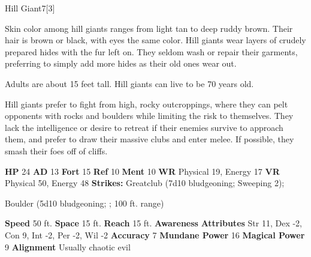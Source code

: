       
  \begin{monsubsection}{Hill Giant}{7}[3]
    \vspace{-1em}\vspace{-1em}
    \vspace{0em}

    
        Skin color among hill giants ranges from light tan to deep ruddy brown. Their hair is brown or black, with eyes the same color. Hill giants wear layers of crudely prepared hides with the fur left on. They seldom wash or repair their garments, preferring to simply add more hides as their old ones wear out.

        Adults are about 15 feet tall. Hill giants can live to be 70 years old.
      
        Hill giants prefer to fight from high, rocky outcroppings, where they can pelt opponents with rocks and boulders while limiting the risk to themselves.
        They lack the intelligence or desire to retreat if their enemies survive to approach them, and prefer to draw their massive clubs and enter melee.
        If possible, they smash their foes off of cliffs.
      

    \begin{spellcontent}
      \begin{spelltargetinginfo}
        \pari \textbf{HP} 24 \monsep
          \textbf{AD} 13 \monsep
          \textbf{Fort} 15 \monsep
          \textbf{Ref} 10 \monsep
          \textbf{Ment} 10
        \pari \textbf{WR} Physical 19, Energy 17 \monsep
        \textbf{VR} Physical 50, Energy 48
        \pari \textbf{Strikes:}
            Greatclub  (7d10 bludgeoning; Sweeping 2);
\par Boulder  (5d10 bludgeoning; ; 100 ft. range)
      \end{spelltargetinginfo}
    \end{spellcontent}
    \begin{monsterfooter}
      \pari \textbf{Speed} 50 ft. \monsep
        \textbf{Space} 15 ft. \monsep
        \textbf{Reach} 15 ft.
      \pari \textbf{Awareness} 
      \pari \textbf{Attributes}
        Str 11, Dex -2,
        Con 9, Int -2,
        Per -2, Wil -2
      \pari \textbf{Accuracy} 7 \monsep
        \textbf{Mundane Power} 16 \monsep
      \textbf{Magical Power} 9
      \pari \textbf{Alignment} Usually chaotic evil
    \end{monsterfooter}
  \end{monsubsection}
